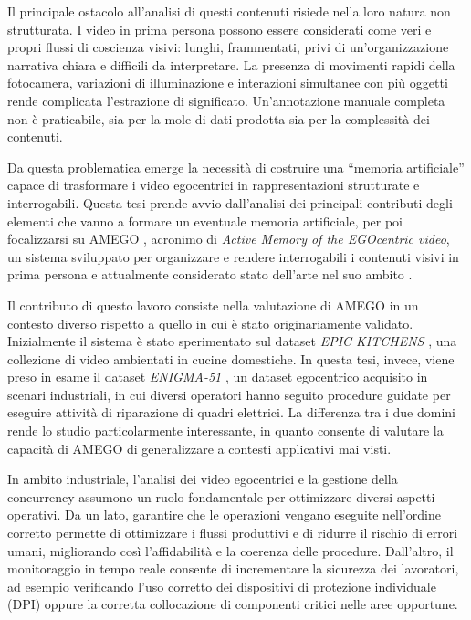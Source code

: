 Il principale ostacolo all'analisi di questi contenuti risiede nella loro natura non strutturata. I video in prima persona possono essere considerati come veri e propri flussi di coscienza visivi: lunghi, frammentati, privi di un'organizzazione narrativa chiara e difficili da interpretare. La presenza di movimenti rapidi della fotocamera, variazioni di illuminazione e interazioni simultanee con più oggetti rende complicata l'estrazione di significato. Un'annotazione manuale completa non è praticabile, sia per la mole di dati prodotta sia per la complessità dei contenuti.

Da questa problematica emerge la necessità di costruire una “memoria artificiale” capace di trasformare i video egocentrici in rappresentazioni strutturate e interrogabili. Questa tesi prende avvio dall'analisi dei principali contributi degli elementi che vanno a formare un eventuale memoria artificiale, per poi focalizzarsi su AMEGO \cite{goletto2024amego}, acronimo di \emph{Active Memory of the EGOcentric video}, un sistema sviluppato per organizzare e rendere interrogabili i contenuti visivi in prima persona e attualmente considerato stato dell'arte nel suo ambito \cite{goletto2024amego}.

Il contributo di questo lavoro consiste nella valutazione di AMEGO in un contesto diverso rispetto a quello in cui è stato originariamente validato. Inizialmente il sistema è stato sperimentato sul dataset \emph{ EPIC KITCHENS }\cite{Damen2021PAMI}, una collezione di video ambientati in cucine domestiche. In questa tesi, invece, viene preso in esame il dataset \emph{ENIGMA-51} \cite{ragusa2023enigma51}, un dataset egocentrico acquisito in scenari industriali, in cui diversi operatori hanno seguito procedure guidate per eseguire attività di riparazione di quadri elettrici. La differenza tra i due domini rende lo studio particolarmente interessante, in quanto consente di valutare la capacità di AMEGO di generalizzare a contesti applicativi mai visti.

In ambito industriale, l'analisi dei video egocentrici e la gestione della concurrency assumono un ruolo fondamentale per ottimizzare diversi aspetti operativi. Da un lato, garantire che le operazioni vengano eseguite nell'ordine corretto permette di ottimizzare i flussi produttivi e di ridurre il rischio di errori umani, migliorando così l'affidabilità e la coerenza delle procedure. Dall'altro, il monitoraggio in tempo reale consente di incrementare la sicurezza dei lavoratori, ad esempio verificando l'uso corretto dei dispositivi di protezione individuale (DPI) oppure la corretta collocazione di componenti critici nelle aree opportune.

